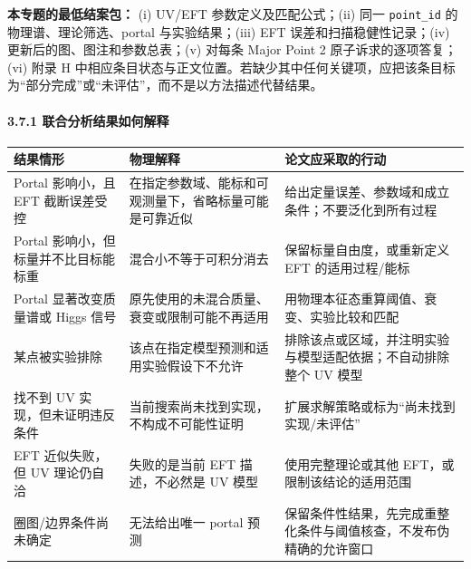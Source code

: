 \documentclass[
  chinese,
  UTF8]{ctexart}
\newcounter{none} %
\begin{document}
\textbf{本专题的最低结案包：} (i) UV/EFT 参数定义及匹配公式；(ii) 同一
\texttt{point\_id} 的物理谱、理论筛选、portal 与实验结果；(iii) EFT
误差和扫描稳健性记录；(iv) 更新后的图、图注和参数总表；(v) 对每条 Major
Point 2 原子诉求的逐项答复；(vi) 附录 H
中相应条目状态与正文位置。若缺少其中任何关键项，应把该条目标为``部分完成''或``未评估''，而不是以方法描述代替结果。

\paragraph{3.7.1
联合分析结果如何解释}\label{ux8054ux5408ux5206ux6790ux7ed3ux679cux5982ux4f55ux89e3ux91ca}

{\def\LTcaptype{none} %
\begin{longtable}[]{@{}
  >{\raggedright\arraybackslash}p{}
  >{\raggedright\arraybackslash}p{}
  >{\raggedright\arraybackslash}p{}@{}}
\toprule\noalign{}
\begin{minipage}[b]{\linewidth}\raggedright
结果情形
\end{minipage} & \begin{minipage}[b]{\linewidth}\raggedright
物理解释
\end{minipage} & \begin{minipage}[b]{\linewidth}\raggedright
论文应采取的行动
\end{minipage} \\
\midrule\noalign{}
\endhead
\bottomrule\noalign{}
\endlastfoot
Portal 影响小，且 EFT 截断误差受控 &
在指定参数域、能标和可观测量下，省略标量可能是可靠近似 &
给出定量误差、参数域和成立条件；不要泛化到所有过程 \\
Portal 影响小，但标量并不比目标能标重 & 混合小不等于可积分消去 &
保留标量自由度，或重新定义 EFT 的适用过程/能标 \\
Portal 显著改变质量谱或 Higgs 信号 &
原先使用的未混合质量、衰变或限制可能不再适用 &
用物理本征态重算阈值、衰变、实验比较和匹配 \\
某点被实验排除 & 该点在指定模型预测和适用实验假设下不允许 &
排除该点或区域，并注明实验与模型适配依据；不自动排除整个 UV 模型 \\
找不到 UV 实现，但未证明违反条件 &
当前搜索尚未找到实现，不构成不可能性证明 &
扩展求解策略或标为``尚未找到实现/未评估'' \\
EFT 近似失败，但 UV 理论仍自洽 & 失败的是当前 EFT 描述，不必然是 UV 模型
& 使用完整理论或其他 EFT，或限制该结论的适用范围 \\
圈图/边界条件尚未确定 & 无法给出唯一 portal 预测 &
保留条件性结果，先完成重整化条件与阈值核查，不发布伪精确的允许窗口 \\
\end{longtable}
}
\end{document}
